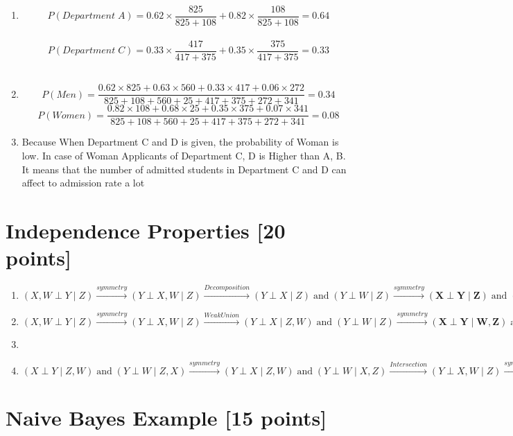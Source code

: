 \documentclass[12pt,a4paper]{article}
\begin{document}
\begin{enumerate}
    \item $$P(Department\;A)=0.62\times\frac{825}{825+108}+0.82\times\frac{108}{825+108}=0.64$$ \\
          $$P(Department\;C)=0.33\times\frac{417}{417+375}+0.35\times\frac{375}{417+375}=0.33$$ \\

    \item $$P(Men)=\frac{0.62\times825+0.63\times560+0.33\times417+0.06\times272}{825+108+560+25+417+375+272+341}=0.34$$
          $$P(Women)=\frac{0.82\times108+0.68\times25+0.35\times375+0.07\times341}{825+108+560+25+417+375+272+341}=0.08$$

    \item Because When Department C and D is given, the probability of Woman is low. In case of Woman Applicants of Department C, D is Higher than A, B. It means that the number of admitted students in Department C and D can affect to admission rate a lot
\end{enumerate}

\section{Independence Properties [20 points]}

\begin{enumerate}
\item $(X,W\perp Y\mid Z) \xrightarrow{symmetry}(Y\perp X,W\mid Z) \xrightarrow{Decomposition}(Y\perp X\mid Z)\;\text{and}\;(Y\perp W\mid Z)
\xrightarrow{symmetry}\mathbf{(X\perp Y\mid Z)}\;\text{and}\;(W\perp Y\mid Z)$ \\

\item $(X,W\perp Y\mid Z) \xrightarrow{symmetry}(Y\perp X,W\mid Z) \xrightarrow{Weak Union}(Y\perp X\mid Z,W)\;\text{and}\;(Y\perp W\mid Z)
\xrightarrow{symmetry}\mathbf{(X\perp Y\mid W,Z)}\;\text{and}\;(W\perp Y\mid Z)$ \\

\item

\item $(X\perp Y\mid Z,W)\;\text{and}\;(Y\perp W\mid Z,X)\xrightarrow{symmetry}(Y\perp X\mid Z,W)\;\text{and}\;(Y\perp W\mid X,Z)\xrightarrow{Intersection}(Y\perp X,W\mid Z)\xrightarrow{symmetry}\mathbf{(X,W\perp Y\mid Z)}$
\end{enumerate}

\section{Naive Bayes Example [15 points]}
\end{document}
